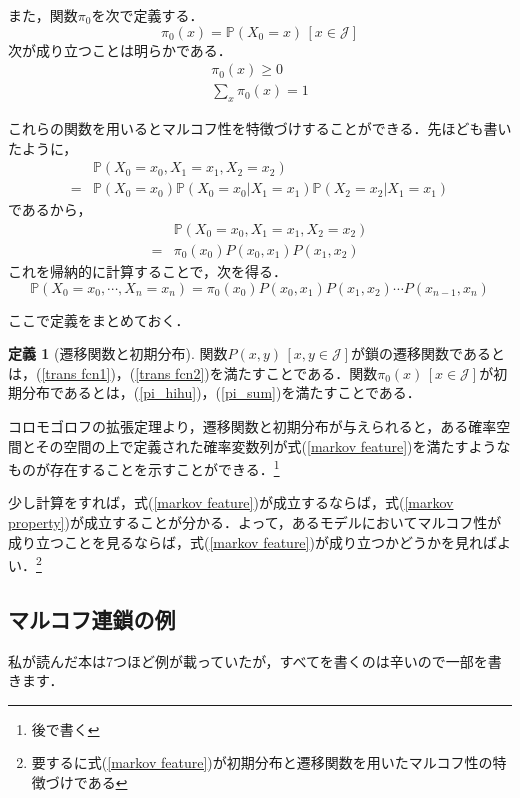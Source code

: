 \documentclass[12pt, a4paper]{jsarticle}
\theoremstyle{definition}
\newtheorem{defn}{定義}[section]
\begin{document}
また，関数$\pi_0$を次で定義する．
\begin{equation}
	\pi_0(x) = \mathbb{P}(X_0 = x ) \, [x \in \mathcal{J}]
\end{equation}
次が成り立つことは明らかである．
\begin{align}
	\pi_0(x) \ge 0 \label{pi_hihu}  \\
	\sum_x \pi_0(x) = 1 \label{pi_sum} 
\end{align}

これらの関数を用いるとマルコフ性を特徴づけすることができる．先ほども書いたように，
\begin{align*}
	& \mathbb{P}(X_0 = x_0 , X_1 = x_1, X_2 = x_2) \\
	=&\mathbb{P}(X_0 = x_0)\mathbb{P}(X_0 = x_0| X_1 = x_1)\mathbb{P}(X_2 = x_2 | X_1 = x_1)
\end{align*}
であるから，
\begin{align*}
	& \mathbb{P}(X_0 = x_0 , X_1 = x_1, X_2 = x_2) \\
	=& \pi_0(x_0) P(x_0,x_1)P(x_1,x_2)
\end{align*}
これを帰納的に計算することで，次を得る．
\begin{equation}
\mathbb{P}(X_0 = x_0 , \cdots , X_n = x_n) = \pi_0(x_0) P(x_0,x_1)P(x_1,x_2)\cdots P(x_{n-1},x_n) \label{markov feature} 
\end{equation}

ここで定義をまとめておく．
\begin{screen}
	\begin{defn}[遷移関数と初期分布]
		関数$P(x,y)\,[x,y \in \mathcal{J}]$が鎖の遷移関数であるとは，(\ref{trans fcn1})，(\ref{trans fcn2})を満たすことである．関数$\pi_0(x)\, [x \in \mathcal{J}]$が初期分布であるとは，(\ref{pi_hihu})，(\ref{pi_sum})を満たすことである．
	\end{defn}
\end{screen}

コロモゴロフの拡張定理より，遷移関数と初期分布が与えられると，ある確率空間とその空間の上で定義された確率変数列が式(\ref{markov feature})を満たすようなものが存在することを示すことができる．\footnote{後で書く}

少し計算をすれば，式(\ref{markov feature})が成立するならば，式(\ref{markov property})が成立することが分かる．よって，あるモデルにおいてマルコフ性が成り立つことを見るならば，式(\ref{markov feature})が成り立つかどうかを見ればよい．\footnote{要するに式(\ref{markov feature})が初期分布と遷移関数を用いたマルコフ性の特徴づけである}

\subsection{マルコフ連鎖の例}
私が読んだ本は7つほど例が載っていたが，すべてを書くのは辛いので一部を書きます．
\end{document}
